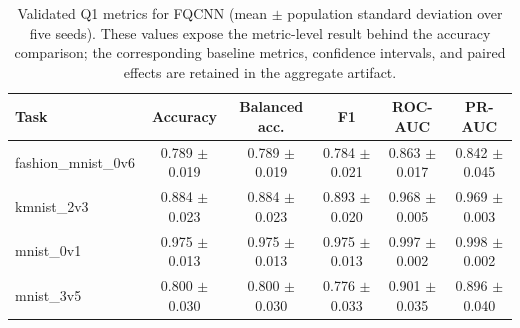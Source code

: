\documentclass[conference]{IEEEtran}
\begin{document}
\begin{table}[!t]
\caption{Validated Q1 metrics for FQCNN (mean $\pm$ population standard deviation over five seeds). These values expose the metric-level result behind the accuracy comparison; the corresponding baseline metrics, confidence intervals, and paired effects are retained in the aggregate artifact.}
\label{tab:q1metrics}
\centering
\begin{tabular}{lccccc}
\toprule
\textbf{Task} & \textbf{Accuracy} & \textbf{Balanced acc.} & \textbf{F1} & \textbf{ROC-AUC} & \textbf{PR-AUC} \\
\midrule
fashion\_mnist\_0v6 & 0.789 $\pm$ 0.019 & 0.789 $\pm$ 0.019 & 0.784 $\pm$ 0.021 & 0.863 $\pm$ 0.017 & 0.842 $\pm$ 0.045 \\
kmnist\_2v3 & 0.884 $\pm$ 0.023 & 0.884 $\pm$ 0.023 & 0.893 $\pm$ 0.020 & 0.968 $\pm$ 0.005 & 0.969 $\pm$ 0.003 \\
mnist\_0v1 & 0.975 $\pm$ 0.013 & 0.975 $\pm$ 0.013 & 0.975 $\pm$ 0.013 & 0.997 $\pm$ 0.002 & 0.998 $\pm$ 0.002 \\
mnist\_3v5 & 0.800 $\pm$ 0.030 & 0.800 $\pm$ 0.030 & 0.776 $\pm$ 0.033 & 0.901 $\pm$ 0.035 & 0.896 $\pm$ 0.040 \\
\bottomrule
\end{tabular}
\end{table}
\end{document}
